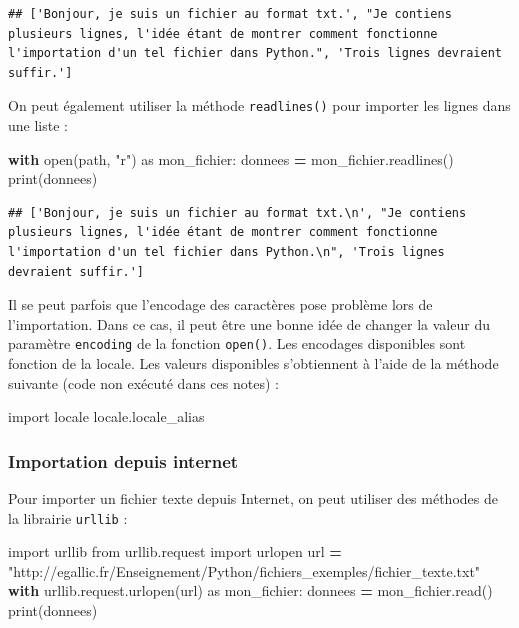 \documentclass[12pt,]{book}
\newenvironment{Shaded}{\begin{snugshade}}{\end{snugshade}}
\newcommand{\StringTok}[1]{\textcolor[rgb]{0.31,0.60,0.02}{#1}}
\newcommand{\ImportTok}[1]{#1}
\newcommand{\ControlFlowTok}[1]{\textcolor[rgb]{0.13,0.29,0.53}{\textbf{#1}}}
\newcommand{\OperatorTok}[1]{\textcolor[rgb]{0.81,0.36,0.00}{\textbf{#1}}}
\newcommand{\BuiltInTok}[1]{#1}
\newcommand{\NormalTok}[1]{#1}
\numberwithin{equation}{section}
\numberwithin{countremarque}{section}
\begin{document}
\begin{lstlisting}
## ['Bonjour, je suis un fichier au format txt.', "Je contiens plusieurs lignes, l'idée étant de montrer comment fonctionne l'importation d'un tel fichier dans Python.", 'Trois lignes devraient suffir.']
\end{lstlisting}

On peut également utiliser la méthode \texttt{readlines()} pour importer
les lignes dans une liste :

\begin{Shaded}
\begin{Highlighting}[]
\ControlFlowTok{with} \BuiltInTok{open}\NormalTok{(path, }\StringTok{"r"}\NormalTok{) }\ImportTok{as}\NormalTok{ mon_fichier:}
\NormalTok{    donnees }\OperatorTok{=}\NormalTok{ mon_fichier.readlines()}
\BuiltInTok{print}\NormalTok{(donnees)}
\end{Highlighting}
\end{Shaded}

\begin{lstlisting}
## ['Bonjour, je suis un fichier au format txt.\n', "Je contiens plusieurs lignes, l'idée étant de montrer comment fonctionne l'importation d'un tel fichier dans Python.\n", 'Trois lignes devraient suffir.']
\end{lstlisting}

Il se peut parfois que l'encodage des caractères pose problème lors de
l'importation. Dans ce cas, il peut être une bonne idée de changer la
valeur du paramètre \texttt{encoding} de la fonction \texttt{open()}.
Les encodages disponibles sont fonction de la locale. Les valeurs
disponibles s'obtiennent à l'aide de la méthode suivante (code non
exécuté dans ces notes) :

\begin{Shaded}
\begin{Highlighting}[]
\ImportTok{import}\NormalTok{ locale}
\NormalTok{locale.locale_alias}
\end{Highlighting}
\end{Shaded}

\subsubsection{Importation depuis
internet}\label{importation-depuis-internet}

Pour importer un fichier texte depuis Internet, on peut utiliser des
méthodes de la librairie \texttt{urllib} :

\begin{Shaded}
\begin{Highlighting}[]
\ImportTok{import}\NormalTok{ urllib}
\ImportTok{from}\NormalTok{ urllib.request }\ImportTok{import}\NormalTok{ urlopen}
\NormalTok{url }\OperatorTok{=} \StringTok{"http://egallic.fr/Enseignement/Python/fichiers_exemples/fichier_texte.txt"}
\ControlFlowTok{with}\NormalTok{ urllib.request.urlopen(url) }\ImportTok{as}\NormalTok{ mon_fichier:}
\NormalTok{   donnees }\OperatorTok{=}\NormalTok{ mon_fichier.read()}
\BuiltInTok{print}\NormalTok{(donnees)}
\end{Highlighting}
\end{Shaded}
\end{document}
